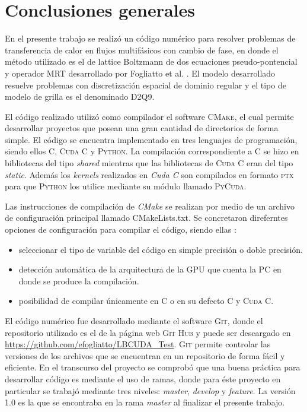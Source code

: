 \chapter{Conclusiones generales}
\graphicspath{{figs/cap4/}}
\label{cap5}

En el presente trabajo se realizó un código numérico para resolver problemas de transferencia de calor en flujos multifásicos con cambio de fase, en donde el método utilizado es el de lattice Boltzmann de dos ecuaciones pseudo-pontencial y operador MRT desarrollado por Fogliatto et al. \cite{fogliatto2019transferencia}. El modelo desarrollado resuelve problemas con discretización espacial de dominio regular y el tipo de modelo de grilla es el denominado D2Q9.

El código realizado utilizó como compilador el software \textsc{CMake}, el cual permite desarrollar proyectos que posean una gran cantidad de directorios de forma simple. El código se encuentra implementado en tres lenguajes de programación, siendo ellos \textsc{C}, \textsc{Cuda C} y \textsc{Python}. La compilación correspondiente a \textsc{C} se hizo en bibliotecas del tipo \textit{shared} mientras que las bibliotecas de \textsc{Cuda C} eran del tipo \textit{static}. Además los \textit{kernels} realizados en \textit{Cuda C} son compilados en formato \textsc{ptx} para que \textsc{Python} los utilice mediante su módulo llamado \textsc{PyCuda}.

Las instrucciones de compilación de \textit{CMake} se realizan por medio de un archivo de configuración principal llamado CMakeLists.txt. Se concretaron direferntes opciones de configuración para compilar el código, siendo ellas :

\begin{itemize}
	\item seleccionar el tipo de variable del código en simple precisión o doble precisión. 
	\item detección automática de la arquitectura de la GPU que cuenta la PC en donde se produce la compilación.
	\item posibilidad de compilar únicamente en \textsc{C} o en su defecto \textsc{C} y \textsc{Cuda C}.
\end{itemize}

El código numérico fue desarrollado mediante el software \textsc{Git}, donde el repositorio utilizado es el de la página web \textsc{Git Hub} y puede ser descargado en \url{https://github.com/efogliatto/LBCUDA_Test}. \textsc{Git} permite controlar las versiones de los archivos que se encuentran en un repositorio de forma fácil y eficiente. En el transcurso del proyecto se comprobó que una buena práctica para desarrollar código es mediante el uso de ramas, donde para éste proyecto en particular se trabajó mediante tres niveles: \textit{master}, \textit{develop} y \textit{feature}. La versión 1.0 es la que se encontraba en la rama \textit{master} al finalizar el presente trabajo.

